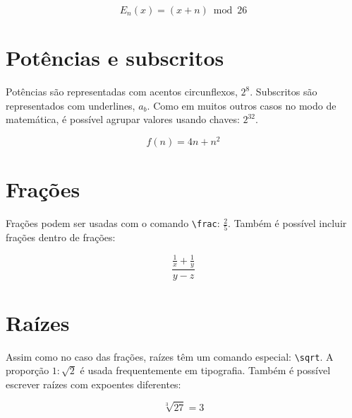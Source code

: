 \documentclass[a4paper,oneside]{article}
\begin{document}
\begin{equation}
  E_n(x) = (x + n) \bmod 26
  \tag{Cifra de César}
\end{equation}

\section{Potências e subscritos}

Potências são representadas com acentos circunflexos, \( 2^8 \). Subscritos são
representados com underlines, \( a_b \). Como em muitos outros casos no modo de
matemática, é possível agrupar valores usando chaves: \( 2^{32} \).

\[ f(n) = 4n + n^2 \]

\section{Frações}

Frações podem ser usadas com o comando \verb+\frac+: \( \frac{2}{5} \). Também
é possível incluir frações dentro de frações:

\[ \frac{\frac{1}{x}+\frac{1}{y}}{y-z} \]

\section{Raízes}

Assim como no caso das frações, raízes têm um comando especial: \verb+\sqrt+.
A proporção \( 1:\sqrt{2} \) é usada frequentemente em tipografia. Também é
possível escrever raízes com expoentes diferentes:

\[ \sqrt[3]{27} = 3 \]
\end{document}
